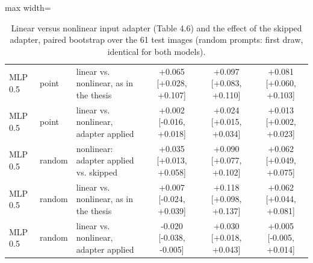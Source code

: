 \begin{table}[htbp]
\begin{adjustbox}{max width=\linewidth}
\begin{tabular}{lllccc}
MLP 0.5 & point & linear vs. nonlinear, as in the thesis & +0.065 [+0.028, +0.107] & +0.097 [+0.083, +0.110] & +0.081 [+0.060, +0.103] \\
MLP 0.5 & point & linear vs. nonlinear, adapter applied & +0.002 [-0.016, +0.018] & +0.024 [+0.015, +0.034] & +0.013 [+0.002, +0.023] \\
\midrule
MLP 0.5 & random & nonlinear: adapter applied vs. skipped & +0.035 [+0.013, +0.058] & +0.090 [+0.077, +0.102] & +0.062 [+0.049, +0.075] \\
MLP 0.5 & random & linear vs. nonlinear, as in the thesis & +0.007 [-0.024, +0.039] & +0.118 [+0.098, +0.137] & +0.062 [+0.044, +0.081] \\
MLP 0.5 & random & linear vs. nonlinear, adapter applied & -0.020 [-0.038, -0.005] & +0.030 [+0.018, +0.043] & +0.005 [-0.005, +0.014] \\
\bottomrule
\end{tabular}
\end{adjustbox}
\caption{Linear versus nonlinear input adapter (Table 4.6) and the effect of the skipped adapter, paired bootstrap over the 61 test images (random prompts: first draw, identical for both models).}
\label{tab:thesis_recheck_adapter_bootstrap}
\end{table}
